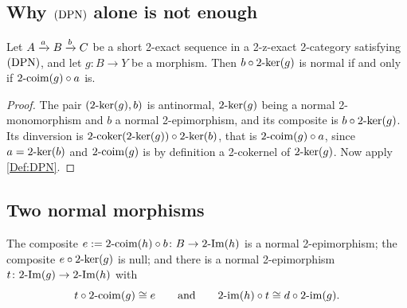 \subsection{Why \texorpdfstring{\(\textup{(DPN)}\)}{(DPN)} alone is not enough}\label{SS:NSDCircular}

\begin{proposition}
  \label{P:TwoSites}   \leanok
  Let \(A\xrightarrow[]{a}B\xrightarrow[]{b}C\) be a short 2-exact sequence in a 2-z-exact 2-category satisfying \(\textup{(DPN)}\), and let \(g\colon B\to Y\) be a morphism. Then \(b\circ2\text{-}\mathrm{ker}(g)\) is normal if and only if \(2\text{-}\mathrm{coim}(g)\circ a\) is.
\end{proposition}

\begin{proof}
  \leanok
  The pair \((2\text{-}\mathrm{ker}(g),b)\) is antinormal, \(2\text{-}\mathrm{ker}(g)\) being a normal 2-monomorphism and \(b\) a normal 2-epimorphism, and its composite is \(b\circ2\text{-}\mathrm{ker}(g)\). Its dinversion is \(2\text{-}\mathrm{coker}(2\text{-}\mathrm{ker}(g))\circ2\text{-}\mathrm{ker}(b)\), that is \(2\text{-}\mathrm{coim}(g)\circ a\), since \(a=2\text{-}\mathrm{ker}(b)\) and \(2\text{-}\mathrm{coim}(g)\) is by definition a 2-cokernel of \(2\text{-}\mathrm{ker}(g)\). Now apply \ref{Def:DPN}.
\end{proof}

\subsection{Two normal morphisms}\label{SS:NSDNormal}

\begin{lemma}
  \label{L:NSDEpi}   \leanok
  The composite \(e\mathrel{:=}2\text{-}\mathrm{coim}(h)\circ b\colon B\to2\text{-}\mathrm{Im}(h)\) is a normal 2-epimorphism; the composite \(e\circ2\text{-}\mathrm{ker}(g)\) is null; and there is a normal 2-epimorphism \(t\colon2\text{-}\mathrm{Im}(g)\to2\text{-}\mathrm{Im}(h)\) with
	\[
		t\circ2\text{-}\mathrm{coim}(g)\cong e\qquad\text{and}\qquad2\text{-}\mathrm{im}(h)\circ t\cong d\circ2\text{-}\mathrm{im}(g)\text{.}
	\]
\end{lemma}

